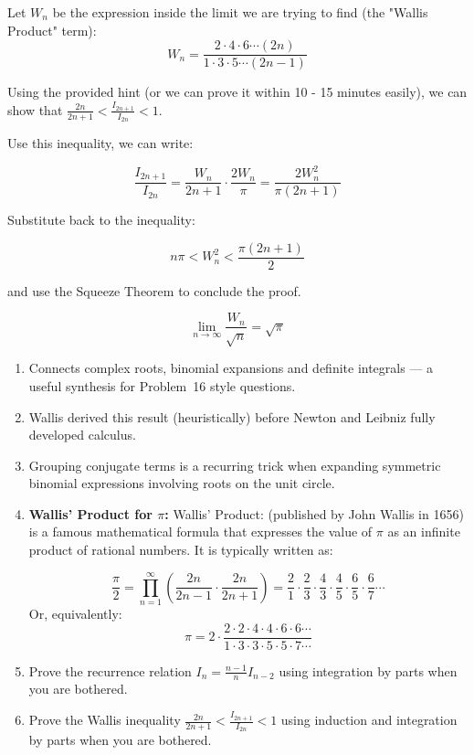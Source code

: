 \begin{solution}
    Let $W_n$ be the expression inside the limit we are trying to find (the "Wallis Product" term):$$W_n = \frac{2 \cdot 4 \cdot 6 \cdots (2n)}{1 \cdot 3 \cdot 5 \cdots (2n-1)}$$


    
    Using the provided hint (or we can prove it within 10 - 15 minutes easily), we can show that 
    $\frac{2n}{2n+1} < \frac{I_{2n+1}}{I_{2n}} < 1$.

    Use this inequality, we can write:

    $$\frac{I_{2n+1}}{I_{2n}} = \frac{W_n}{2n+1} \cdot \frac{2W_n}{\pi} = \frac{2 W_n^2}{\pi(2n+1)}$$

    Substitute back to the inequality:

    $$n\pi < W_n^2 < \frac{\pi(2n+1)}{2}$$

    and use the Squeeze Theorem to conclude the proof. 

    $$\lim_{n \to \infty} \frac{W_n}{\sqrt{n}} = \sqrt{\pi}$$

\end{solution}

\begin{takeaways}
\begin{enumerate}
    \item Connects complex roots, binomial expansions and definite integrals — a useful synthesis for Problem~16 style questions.
    \item Wallis derived this result (heuristically) before Newton and Leibniz fully developed calculus.
    \item Grouping conjugate terms is a recurring trick when expanding symmetric binomial expressions involving roots on the unit circle.
    \item \textbf{Wallis' Product for $\pi$: } 
    Wallis' Product: (published by John Wallis in 1656) is a famous mathematical formula 
    that expresses the value of $\pi$ as an infinite product of rational numbers. 
    It is typically written as:
    
    $$\frac{\pi}{2} = \prod_{n=1}^{\infty} \left( \frac{2n}{2n-1} \cdot \frac{2n}{2n+1} \right) 
    = \frac{2}{1} \cdot \frac{2}{3} \cdot \frac{4}{3} \cdot \frac{4}{5} \cdot \frac{6}{5} \cdot \frac{6}{7} \cdots$$Or, 
    equivalently:$$\pi = 2 \cdot \frac{2 \cdot 2 \cdot 4 \cdot 4 \cdot 6 \cdot 6 \cdots}{1 \cdot 3 \cdot 3 \cdot 5 \cdot 5 \cdot 7 \cdots}$$
    \item Prove the recurrence relation $I_n = \frac{n-1}{n} I_{n-2}$ using integration by parts when you are bothered.
    \item Prove the Wallis inequality $\frac{2n}{2n+1} < \frac{I_{2n+1}}{I_{2n}} < 1$ using induction and integration by parts when you are bothered.
\end{enumerate}
\end{takeaways}

